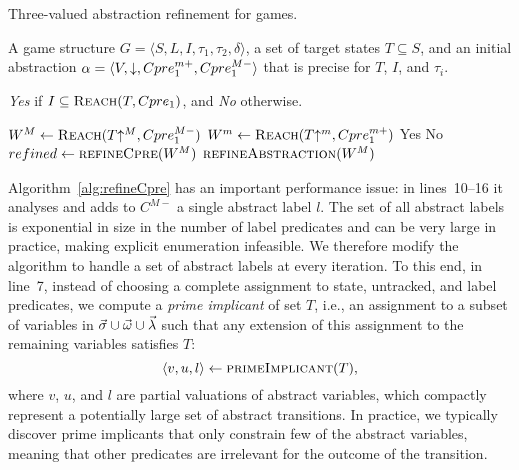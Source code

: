 %

\begin{algorithm}
\caption{Three-valued abstraction refinement for games.}
\label{alg:genericc}

\begin{algorithmic}[1]

     A game structure $G = \langle S, L, I, \tau_1, \tau_2, \delta \rangle$, a set 
    of target states $T\subseteq S$, and an initial abstraction $\alpha=\langle V, \mathord{\downarrow}, Cpre_1^{m+}, Cpre_1^{M-} \rangle$
    that is precise for $T$, $I$, and $\tau_i$.

     {\it Yes} if $I \subseteq \textsc{Reach}(T, Cpre_1)$, and {\it No} otherwise.

    \Loop
        \State $W^M \gets \textsc{Reach}(T\mathord{\uparrow^M}, Cpre_1^{M-})$
        \State $W^m \gets \textsc{Reach}(T\mathord{\uparrow^m}, Cpre_1^{m+})$
            \State\Return Yes
            \State\Return No
        \Else       
            \State $refined \gets \Call{refineCpre}{W^M}$
                \State$\Call{refineAbstraction}{W^M}$
            \EndIf
        \EndIf
    \EndLoop
\end{algorithmic}
\end{algorithm}

Algorithm~\ref{alg:refineCpre} has an important performance issue: 
in lines~10--16 it analyses and adds to $C^{M-}$ a single abstract 
label $l$.  The set of all abstract labels is exponential in size 
in the number of label predicates and can be very large in 
practice, making explicit enumeration infeasible.  We therefore 
modify the algorithm to handle a set of abstract labels at every 
iteration.  To this end, in line~7, instead of choosing a complete 
assignment to state, untracked, and label predicates, we compute a 
\emph{prime implicant} of set $T$, i.e., an assignment to a subset 
of variables in $\vec{\sigma}\cup\vec{\omega}\cup\vec{\lambda}$ 
such that any extension of this assignment to the remaining 
variables satisfies $T$:
$$\langle v,u,l\rangle \gets \textsc{primeImplicant}(T),$$
where $v$, $u$, and $l$ are partial valuations of abstract 
variables, which compactly represent a potentially large set of 
abstract transitions.  In practice, we typically discover prime 
implicants that only constrain few of the abstract variables, 
meaning that other predicates are irrelevant for the outcome of 
the transition.  

